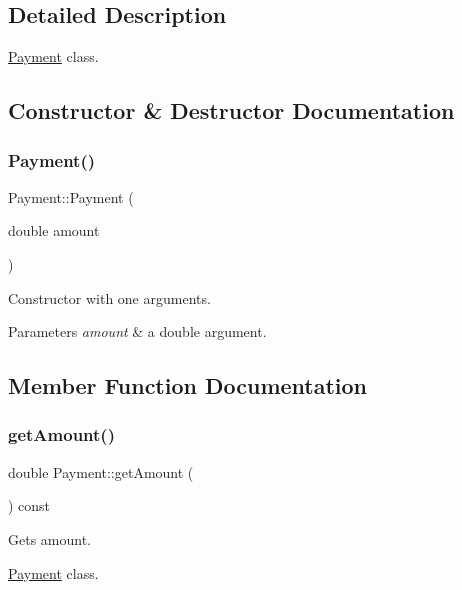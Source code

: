 \subsection{Detailed Description}
\hyperlink{classPayment}{Payment} class. 

\subsection{Constructor \& Destructor Documentation}
\mbox{\label{classPayment_abe05f968db46b0211379eeee357ef58d}} 
\subsubsection{\texorpdfstring{Payment()}{Payment()}}
{\footnotesize\ttfamily Payment\+::\+Payment (\begin{DoxyParamCaption}\item[{double}]{amount }\end{DoxyParamCaption})}



Constructor with one arguments. 


\begin{DoxyParams}{Parameters}
{\em amount} & a double argument. \\
\hline
\end{DoxyParams}


\subsection{Member Function Documentation}
\mbox{\label{classPayment_a589cf7d06f7365d5505948bdef033828}} 
\subsubsection{\texorpdfstring{get\+Amount()}{getAmount()}}
{\footnotesize\ttfamily double Payment\+::get\+Amount (\begin{DoxyParamCaption}{ }\end{DoxyParamCaption}) const}



Gets amount. 

\hyperlink{classPayment}{Payment} class.

